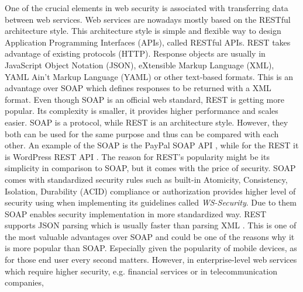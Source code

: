 \documentclass{article} %
\begin{document}
One of the crucial elements in web security is associated with transferring data between web services. Web services are nowadays mostly based on the RESTful architecture style. This architecture style is simple and flexible way to design Application Programming Interfaces (APIs), called RESTful APIs. REST takes advantage of existing protocols (HTTP). Response objects are usually in JavaScript Object Notation (JSON), eXtensible Markup Language (XML), YAML Ain't Markup Language (YAML) or other text-based formats. This is an advantage over SOAP which defines responses to be returned with a XML format. Even though SOAP is an official web standard, REST is getting more popular. Its complexity is smaller, it provides higher performance and scales easier. SOAP is a protocol, while REST is an architecture style. However, they both can be used for the same purpose and thus can be compared with each other. An example of the SOAP is the PayPal SOAP API \cite{bib:soap_api}, while for the REST it is WordPress REST API \cite{bib:wordpress_api}. The reason for REST's popularity might be its simplicity in comparison to SOAP, but it comes with the price of security. SOAP comes with standardized security rules such as built-in Atomicity, Consistency, Isolation, Durability (ACID) compliance or authorization provides higher level of security using when implementing its guidelines called \textit{WS-Security}. Due to them SOAP enables security implementation in more standardized way. REST supports JSON parsing which is usually faster than parsing XML \cite{bib:parsing}. This is one of the most valuable advantages over SOAP and could be one of the reasons why it is more popular than SOAP. Especially given the popularity of mobile devices, as for those end user every second matters. However, in enterprise-level web services which require higher security, e.g. financial services or in telecommunication companies, 
\end{document}
